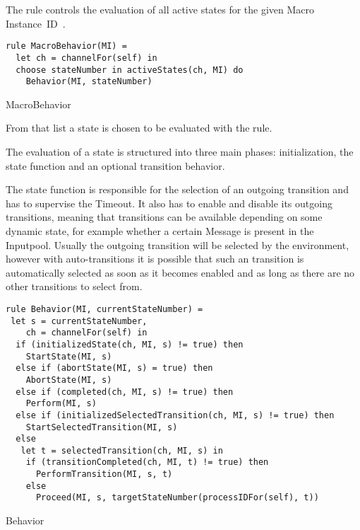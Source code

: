 


The  rule controls the evaluation of all active
states for the given Macro Instance~ID~.


\begin{listing}[H]
\begin{verbatim}
rule MacroBehavior(MI) =
  let ch = channelFor(self) in
  choose stateNumber in activeStates(ch, MI) do
    Behavior(MI, stateNumber)
\end{verbatim}
\caption{MacroBehavior}
\label{lst:shortasm:MacroBehavior}
\end{listing}

From that list a state  is chosen to be evaluated with the  rule.



The evaluation of a state is structured into three main phases: initialization,
the state function and an optional transition behavior.

The state function is responsible for the selection of an outgoing transition and
has to supervise the Timeout. It also has to enable and disable its outgoing
transitions, meaning that transitions can be available depending on some dynamic state,
for example whether a certain Message is present in the Inputpool.
Usually the outgoing transition will be selected by the environment, however with
auto-transitions it is possible that such an transition is automatically selected as soon
as it becomes enabled and as long as there are no other transitions to select from.


\begin{listing}[H]
\begin{verbatim}
rule Behavior(MI, currentStateNumber) =
 let s = currentStateNumber,
    ch = channelFor(self) in
  if (initializedState(ch, MI, s) != true) then
    StartState(MI, s)
  else if (abortState(MI, s) = true) then
    AbortState(MI, s)
  else if (completed(ch, MI, s) != true) then
    Perform(MI, s)
  else if (initializedSelectedTransition(ch, MI, s) != true) then
    StartSelectedTransition(MI, s)
  else
   let t = selectedTransition(ch, MI, s) in
    if (transitionCompleted(ch, MI, t) != true) then
      PerformTransition(MI, s, t)
    else
      Proceed(MI, s, targetStateNumber(processIDFor(self), t))
\end{verbatim}
\caption{Behavior}
\label{lst:shortasm:Behavior}
\end{listing}


